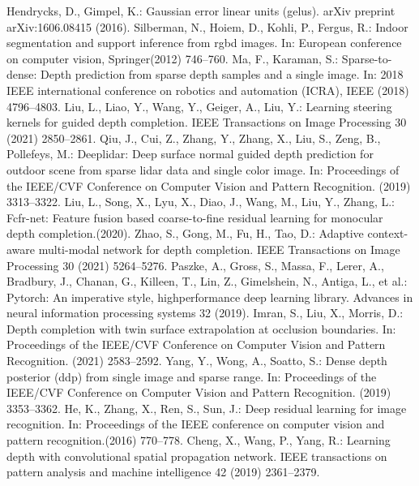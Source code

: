 \documentclass[conference]{IEEEtran}
\begin{document}
\begin{thebibliography}{00}
 Hendrycks, D., Gimpel, K.: Gaussian error linear units (gelus). arXiv preprint arXiv:1606.08415 (2016).
 Silberman, N., Hoiem, D., Kohli, P., Fergus, R.: Indoor segmentation and support
inference from rgbd images. In: European conference on computer vision, Springer(2012) 746–760.
 Ma, F., Karaman, S.: Sparse-to-dense: Depth prediction from sparse depth samples and a single image. In: 2018 IEEE international conference on robotics and automation (ICRA), IEEE (2018) 4796–4803.
 Liu, L., Liao, Y., Wang, Y., Geiger, A., Liu, Y.: Learning steering kernels for guided depth completion. IEEE Transactions on Image Processing 30 (2021) 2850–2861.
 Qiu, J., Cui, Z., Zhang, Y., Zhang, X., Liu, S., Zeng, B., Pollefeys, M.: Deeplidar: Deep surface normal guided depth prediction for outdoor scene from sparse lidar data and single color image. In: Proceedings of the IEEE/CVF Conference on Computer Vision and Pattern Recognition. (2019) 3313–3322.
 Liu, L., Song, X., Lyu, X., Diao, J., Wang, M., Liu, Y., Zhang, L.: Fcfr-net: Feature fusion based coarse-to-fine residual learning for monocular depth completion.(2020).
 Zhao, S., Gong, M., Fu, H., Tao, D.: Adaptive context-aware multi-modal network
for depth completion. IEEE Transactions on Image Processing 30 (2021) 5264–5276.
Paszke, A., Gross, S., Massa, F., Lerer, A., Bradbury, J., Chanan, G., Killeen, T.,
Lin, Z., Gimelshein, N., Antiga, L., et al.: Pytorch: An imperative style, highperformance deep learning library. Advances in neural information processing systems 32 (2019).
 Imran, S., Liu, X., Morris, D.: Depth completion with twin surface extrapolation at
occlusion boundaries. In: Proceedings of the IEEE/CVF Conference on Computer
Vision and Pattern Recognition. (2021) 2583–2592.
 Yang, Y., Wong, A., Soatto, S.: Dense depth posterior (ddp) from single image and
sparse range. In: Proceedings of the IEEE/CVF Conference on Computer Vision
and Pattern Recognition. (2019) 3353–3362.
 He, K., Zhang, X., Ren, S., Sun, J.: Deep residual learning for image recognition.
In: Proceedings of the IEEE conference on computer vision and pattern recognition.(2016) 770–778.
 Cheng, X., Wang, P., Yang, R.: Learning depth with convolutional spatial propagation network. IEEE transactions on pattern analysis and machine intelligence 42 (2019) 2361–2379.

\end{thebibliography}
\end{document}
